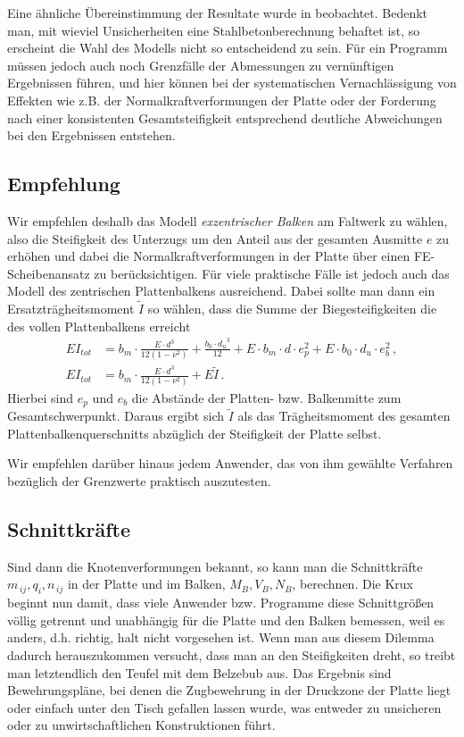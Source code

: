 Eine \"{a}hnliche \"{U}bereinstimmung der Resultate wurde in \cite{Wu1} beobachtet. Bedenkt man, mit wieviel Unsicherheiten eine Stahlbetonberechnung behaftet ist, so erscheint die Wahl des Modells nicht so entscheidend zu sein. F\"{u}r ein Programm m\"{u}ssen jedoch auch noch Grenzf\"{a}lle der Abmessungen zu vern\"{u}nftigen Ergebnissen f\"{u}hren, und hier k\"{o}nnen bei der systematischen Vernachl\"{a}ssigung von Effekten wie z.B. der Normalkraftverformungen der Platte oder der Forderung nach einer konsistenten Gesamtsteifigkeit entsprechend deutliche Abweichungen bei den Ergebnissen entstehen.
\vspace{-0.5cm}
{\textcolor{sectionTitleBlue}{\subsection{Empfehlung}}} Wir empfehlen deshalb das Modell
{\em exzentrischer Balken\/} am Faltwerk zu w\"{a}hlen, also die Steifigkeit des Unterzugs um den Anteil aus der gesamten Ausmitte $e$ zu erh\"{o}hen und dabei die Normalkraftverformungen in der Platte \"{u}ber einen FE-Scheibenansatz zu ber\"{u}cksichtigen. F\"{u}r viele praktische F\"{a}lle ist jedoch auch das Modell des zentrischen Plattenbalkens ausreichend. Dabei sollte man dann ein Ersatztr\"{a}gheitsmoment $\tilde I$ so w\"{a}hlen, dass die Summe der Biegesteifigkeiten die des vollen Plattenbalkens erreicht
\begin{align}
EI_{tot} &= b_m \cdot \frac{E \cdot d^3}{12(1-\nu^2)} + \frac{b_0\cdot{d_u}^3}{12} + E
\cdot b_m \cdot d \cdot e_p^2 + E \cdot b_0 \cdot d_u \cdot e_b^2\,,\\
EI_{tot} &=
b_m \cdot \frac{E \cdot d^3}{12(1-\nu^2)} + E \tilde I\,.
\end{align}
Hierbei sind $e_p$ und $e_b$ die Abst\"{a}nde der Platten- bzw. Balkenmitte zum Gesamtschwerpunkt. Daraus ergibt sich $\tilde I$ als das Tr\"{a}gheitsmoment des gesamten Plattenbalkenquerschnitts abz\"{u}glich der Steifigkeit der Platte selbst.

Wir empfehlen dar\"{u}ber hinaus jedem Anwender, das von ihm gew\"{a}hlte Verfahren bez\"{u}glich der Grenzwerte praktisch auszutesten.

{\textcolor{sectionTitleBlue}{\subsection{Schnittkr\"{a}fte}}}
Sind dann die Knotenverformungen bekannt, so kann man die Schnittkr\"{a}fte $m_{\,ij},q_i,n_{\,ij}$ in der Platte und im Balken, $M_B, V_B, N_B$, berechnen. Die Krux beginnt nun damit, dass viele Anwender bzw. Programme diese Schnittgr\"{o}{\ss}en v\"{o}llig getrennt und unabh\"{a}ngig f\"{u}r die Platte und den Balken bemessen, weil es anders, d.h. richtig, halt nicht vorgesehen ist. Wenn man aus diesem Dilemma dadurch herauszukommen versucht, dass man an den Steifigkeiten dreht, so treibt man letztendlich den Teufel mit dem Belzebub aus. Das Ergebnis sind Bewehrungspl\"{a}ne, bei denen die Zugbewehrung in der Druckzone der Platte liegt oder einfach unter den Tisch gefallen lassen wurde, was entweder zu unsicheren oder zu unwirtschaftlichen Konstruktionen f\"{u}hrt.

